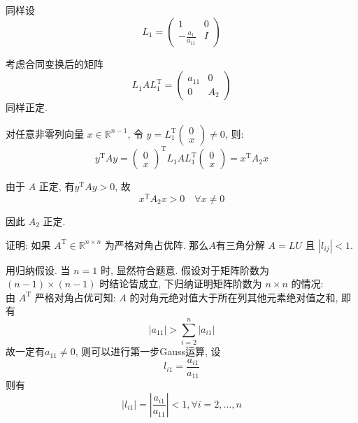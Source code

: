 \documentclass[12pt, answers]{exam}     %
\newcommand{\R}{\mathbb{R}}
\newcommand{\T}{\mathrm{T}}
\begin{document}
\begin{questions}
\begin{solution}
同样设
\[
L_1 = 
\begin{pmatrix}
1 & 0 \\
-\frac{a_1}{a_{11}} & I
\end{pmatrix}
\]

考虑合同变换后的矩阵
\[
L_1 A L_1^{\T} = 
\begin{pmatrix}
a_{11} & 0 \\
0 & A_2
\end{pmatrix}
\]
同样正定.

对任意非零列向量 \( x \in \R^{n-1} \), 令 \( y = L_1^{\T} \begin{pmatrix} 0 \\ x \end{pmatrix} \ne 0 \), 则: 
\[
y^{\T} A y = \begin{pmatrix} 0 \\ x \end{pmatrix}^{\T} L_1 A L_1^{\T} \begin{pmatrix} 0 \\ x \end{pmatrix} = x^{\T} A_2 x
\]

由于 \( A \) 正定, 有\( y^{\T} A y > 0 \), 故
\[
x^{\T} A_2 x > 0 \quad \forall x \neq 0
\]

因此 \( A_2 \) 正定.
\end{solution}

\question{}证明: 如果 \( A^{\T} \in \R^{n \times n} \) 为严格对角占优阵. 那么\( A \)有三角分解 \( A = LU \) 且 \( |l_{ij}| < 1 \).
\begin{solution}用归纳假设. 当 \( n = 1 \) 时, 显然符合题意. 假设对于矩阵阶数为 \( (n - 1) \times (n - 1) \) 时结论皆成立, 下归纳证明矩阵阶数为 \( n \times n \) 的情况: \\
由 \( A^{\T} \) 严格对角占优可知: \( A \) 的对角元绝对值大于所在列其他元素绝对值之和, 即有
\[ |a_{11}| > \sum_{i=2}^n |a_{i1}| \]
故一定有\( a_{11} \neq 0 \), 则可以进行第一步Gauss运算, 设
\[ l_{i1} = \frac{a_{i1}}{a_{11}} \]
则有
\[ |l_{i1}| = \left|\frac{a_{i1}}{a_{11}}\right| < 1, \forall i = 2, \ldots, n \]


\end{solution}
\end{questions}
\end{document}

